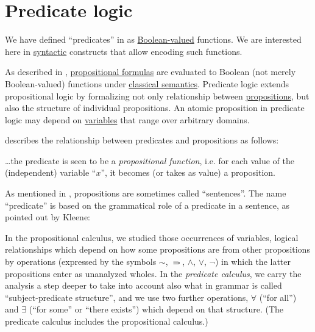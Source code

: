 \section{Predicate logic}\label{sec:predicate_logic}

\begin{remark}\label{rem:predicate_logic}
  We have defined \enquote{predicates} in  as \hyperref[con:boolean_value]{Boolean-valued} functions. We are interested here in \hyperref[con:syntax_semantics_duality]{syntactic} constructs that allow encoding such functions.

  As described in , \hyperref[def:propositional_syntax/formula]{propositional formulas} are evaluated to Boolean (not merely Boolean-valued) functions under \hyperref[def:first_order_semantics]{classical semantics}. Predicate logic extends propositional logic by formalizing not only relationship between \hyperref[con:proposition]{propositions}, but also the structure of individual propositions. An atomic proposition in predicate logic may depend on \hyperref[con:variable]{variables} that range over arbitrary domains.

   describes the relationship between predicates and propositions as follows:
  \begin{displayquote}
    \ldots the predicate is seen to be a \textit{propositional function}, i.e. for each value of the (independent) variable \enquote{\( x \)}, it becomes (or takes as value) a proposition.
  \end{displayquote}

  As mentioned in , propositions are sometimes called \enquote{sentences}. The name \enquote{predicate} is based on the grammatical role of a predicate in a sentence, as pointed out by Kleene:
  \begin{displayquote}
    In the propositional calculus, we studied those occurrences of variables, logical relationships which depend on how some propositions are from other propositions by operations (expressed by the symbols \( \sim \), \( \rightimply \), \( \land \), \( \vee \), \( \neg \)) in which the latter
    propositions enter as unanalyzed wholes. In the \textit{predicate calculus}, we carry the analysis a step deeper to take into account also what in grammar is called \enquote{subject-predicate structure}, and we use two further operations, \( \forall \) (\enquote{for all}) and \( \exists \) (\enquote{for some} or \enquote{there exists}) which depend on that structure. (The predicate calculus includes the propositional calculus.)
  \end{displayquote}


\end{remark}
